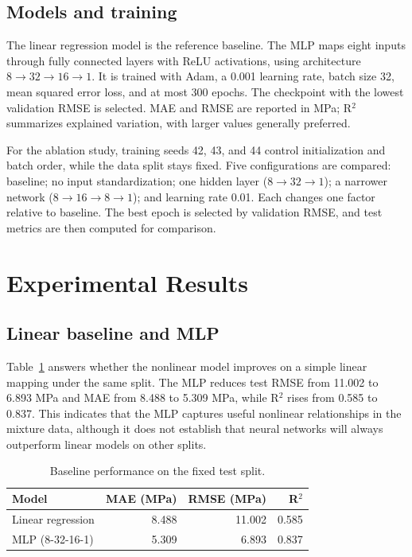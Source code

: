 \documentclass[sigconf,nonacm]{acmart}
\begin{document}
\subsection{Models and training}
The linear regression model is the reference baseline. The MLP maps eight inputs through fully connected layers with ReLU activations, using architecture $8\rightarrow32\rightarrow16\rightarrow1$. It is trained with Adam, a 0.001 learning rate, batch size 32, mean squared error loss, and at most 300 epochs. The checkpoint with the lowest validation RMSE is selected. MAE and RMSE are reported in MPa; R$^2$ summarizes explained variation, with larger values generally preferred.

For the ablation study, training seeds 42, 43, and 44 control initialization and batch order, while the data split stays fixed. Five configurations are compared: baseline; no input standardization; one hidden layer ($8\rightarrow32\rightarrow1$); a narrower network ($8\rightarrow16\rightarrow8\rightarrow1$); and learning rate 0.01. Each changes one factor relative to baseline. The best epoch is selected by validation RMSE, and test metrics are then computed for comparison.

\section{Experimental Results}
\subsection{Linear baseline and MLP}
Table~\ref{tab:baseline} answers whether the nonlinear model improves on a simple linear mapping under the same split. The MLP reduces test RMSE from 11.002 to 6.893 MPa and MAE from 8.488 to 5.309 MPa, while R$^2$ rises from 0.585 to 0.837. This indicates that the MLP captures useful nonlinear relationships in the mixture data, although it does not establish that neural networks will always outperform linear models on other splits.

\begin{table}[t]
\caption{Baseline performance on the fixed test split.}
\label{tab:baseline}
\centering
\small
\begin{tabular}{lrrr}
\toprule
Model & MAE (MPa) & RMSE (MPa) & R$^2$\\
\midrule
Linear regression & 8.488 & 11.002 & 0.585\\
MLP (8-32-16-1) & 5.309 & 6.893 & 0.837\\
\bottomrule
\end{tabular}
\end{table}
\end{document}
